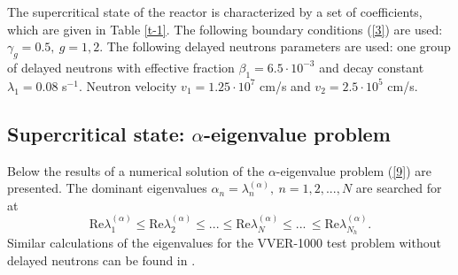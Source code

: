 \documentclass[a4paper]{jpconf}
\begin{document}
The supercritical state of the reactor is characterized by a set of coefficients, which are given in Table \ref{t-1}. 
The following boundary conditions (\ref{3}) are used:  $\gamma_g = 0.5, \ g = 1,2$.  
The following delayed neutrons parameters are used: one group of delayed neutrons with effective fraction $\beta_1 = 6.5\cdot10^{-3}$ and decay constant $\lambda_1 = 0.08$ s$^{-1}$. 
Neutron velocity  $v_1 = 1.25 \cdot 10^7$ cm/s and $v_2 = 2.5 \cdot 10^5$ cm/s.

\subsection{Supercritical state: $\alpha$-eigenvalue problem} 

Below the results of a numerical solution of the $\alpha$-eigenvalue problem (\ref{9}) are presented. 
The dominant eigenvalues $\alpha_n = \lambda_n^{(\alpha)}, \ n = 1,2, ..., N$ are searched for at
\[
 \mathrm{Re}  \lambda_1^{(\alpha)} \leq  \mathrm{Re}  \lambda_2^{(\alpha)} \leq ... 
 \leq \mathrm{Re}  \lambda_N^{(\alpha)} \leq ...\, \leq \mathrm{Re}  \lambda_{N_h}^{(\alpha)}.
\]
Similar calculations of the eigenvalues for the VVER-1000 test problem without delayed neutrons can be found in \cite{avvakumov2017spectral}. 
\end{document}
